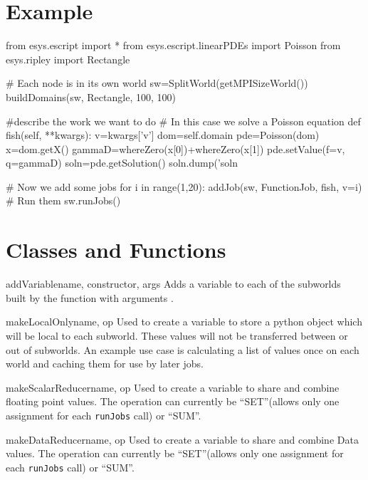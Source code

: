 \section{Example}
\begin{python}
from esys.escript import *
from esys.escript.linearPDEs import Poisson
from esys.ripley import Rectangle 

# Each node is in its own world
sw=SplitWorld(getMPISizeWorld())
buildDomains(sw, Rectangle, 100, 100)

#describe the work we want to do
# In this case we solve a Poisson equation
def fish(self, **kwargs):
    v=kwargs['v']
    dom=self.domain
    pde=Poisson(dom)
    x=dom.getX()
    gammaD=whereZero(x[0])+whereZero(x[1])
    pde.setValue(f=v, q=gammaD)
    soln=pde.getSolution()
    soln.dump('soln%

# Now we add some jobs
for i in range(1,20):
    addJob(sw, FunctionJob, fish, v=i)
# Run them
sw.runJobs() 
\end{python}

\section{Classes and Functions}



\begin{funcdesc}{addVariable}{name, constructor, args}
Adds a variable to each of the subworlds built by the function  with arguments . 
\end{funcdesc}

\begin{funcdesc}{makeLocalOnly}{name, op}
Used to create a variable to store a python object which will be local to each subworld.
These values will not be transferred between or out of subworlds.
An example use case is calculating a list of values once on each world and caching them for use by later jobs.
\end{funcdesc}

\begin{funcdesc}{makeScalarReducer}{name, op}
Used to create a variable to share and combine floating point values.
The operation can currently be ``SET''(allows only one assignment for each \texttt{runJobs} call) or ``SUM''.
\end{funcdesc}

\begin{funcdesc}{makeDataReducer}{name, op}
Used to create a variable to share and combine Data values.
The operation can currently be ``SET''(allows only one assignment for each \texttt{runJobs} call) or ``SUM''.
\end{funcdesc}


